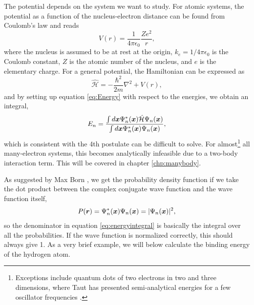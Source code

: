 The potential depends on the system we want to study. For atomic systems, the potential as a function of the nucleus-electron distance can be found from Coulomb's law and reads 
\begin{equation}
V(r)=\frac{1}{4\pi\epsilon_0}\frac{Ze^2}{r},
\label{eq:atompotential}
\end{equation}
where the nucleus is assumed to be at rest at the origin, $k_e=1/4\pi\epsilon_0$ is the Coulomb constant, $Z$ is the atomic number of the nucleus, and $e$ is the elementary charge. For a general potential, the Hamiltonian can be expressed as 
\begin{equation}
\hat{\mathcal{H}}=-\frac{\hbar^2}{2m}\nabla^2+V(r),
\label{eq:oneparticlehamiltonian}
\end{equation}
and by setting up equation \eqref{eq:Energy} with respect to the energies, we obtain an integral,
\begin{equation}
E_n=\frac{\int d\boldsymbol{{x}}\Psi_n^*(\boldsymbol{{x}})\hat{\mathcal{H}}\Psi_n(\boldsymbol{{x}})}{\int d\boldsymbol{{x}}\Psi_n^*(\boldsymbol{{x}})\Psi_n(\boldsymbol{{x}})},
\label{eq:energyintegral}
\end{equation}
which is consistent with the 4th postulate can be difficult to solve. For almost\footnote{Exceptions include quantum dots of two electrons in two and three dimensions, where Taut has presented semi-analytical energies for a few oscillator frequencies \supercite{taut_two_1993,taut_two_1994}.} all many-electron systems, this becomes analytically infeasible due to a two-body interaction term. This will be covered in chapter \ref{chp:manybody}.

As suggested by Max Born \supercite{born_zur_1926}, we get the probability density function if we take the dot product between the complex conjugate wave function and the wave function itself,
\begin{equation}
P(\boldsymbol{{r}})=\Psi_n^*(\boldsymbol{{x}})\Psi_n(\boldsymbol{{x}})=|\Psi_n(\boldsymbol{{x}})|^2,
\label{eq:pdf}
\end{equation}
so the denominator in equation \eqref{eq:energyintegral} is basically the integral over all the probabilities. If the wave function is normalized correctly, this should always give 1. As a very brief example, we will below calculate the binding energy of the hydrogen atom.

